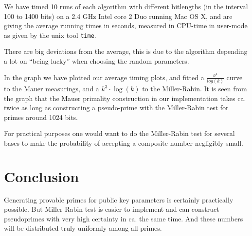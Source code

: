 \documentclass[11pt,a4paper]{article}
\begin{document}
We have timed 10 runs of each algorithm with different bitlengths (in
the interval 100 to 1400 bits) on a 2.4 GHz Intel core 2 Duo running
Mac OS X, and are giving the average running times in seconds,
measured in CPU-time in user-mode as given by the unix tool
\verb|time|. 

There are big deviations from the average, this is due to the
algorithm depending a lot on ``being lucky'' when choosing the random
parameters.

In the graph we have plotted our average timing plots, and fitted a
$\frac{k^4}{log(k)}$ curve to the Mauer measurings, and a
$k^3\cdot\log(k)$ to the Miller-Rabin.  It is seen from the graph that the Mauer
primality construction in our implementation takes ca. twice as long
as constructing a pseudo-prime with the Miller-Rabin test for primes
around 1024 bits.

For practical purposes one would want to do the Miller-Rabin test for
several bases to make the probability of accepting a composite number
negligibly small.
\section{Conclusion}
Generating provable primes for public key parameters is certainly
practically possible. But Miller-Rabin test is easier to implement and
can construct pseudoprimes with very high certainty in ca. the same
time. And these numbers will be distributed truly uniformly among all
primes.


{}

\end{document}
